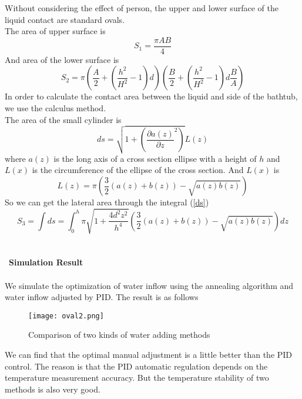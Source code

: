 \documentclass{mcmthesis}
\begin{document}
\indent Without considering the effect of person, the upper and lower surface of the liquid contact are standard ovals.\\
\indent The area of upper surface is\\
\begin{equation}
S_{1}=\frac{\pi AB}{4}
\end{equation}
\indent And area of the lower surface is\\
\begin{equation}
	S_{2}=\pi (\frac{A}{2}+(\frac{h^{2}}{H^{2}}-1)d)(\frac{B}{2}+(\frac{h^{2}}{H^{2}}-1)d\frac{B}{A})
\end{equation}
\indent In order to calculate the contact area between the liquid and side of the bathtub, we use the calculus method.\\
\indent The area of the small cylinder is 
\begin{equation}
ds=\sqrt{1+(\frac{\partial a(z)}{\partial z}^{2})} L(z)
\label{ds}
\end{equation}
\indent where $a(z)$ is the long axis of a cross section ellipse with a height of $h$ and $L(x)$ is the circumference of the ellipse of the cross section. And $L(x)$ is
\begin{equation}
L(z)=\pi (\frac{3}{2}(a(z)+b(z))-\sqrt{a(z)b(z)})
\end{equation} 
\indent So we can get the lateral area through the integral (\ref{ds})
\begin{equation}
	S_{3}=\int ds=\int_{0}^{h}\pi \sqrt{1+\frac{4d^{2}z^{2}}{h^{4}}}(\frac{3}{2}(a(z)+b(z))-\sqrt{a(z)b(z)})dz
\end{equation}\\\\
\noindent\
\textbf{Simulation Result}\\\\
\indent We simulate the optimization of water inflow using the annealing algorithm  and water inflow adjusted by PID. The result is as follows
\begin{figure}[H]
	\centerline{\texttt{[image: oval2.png]}}
	\caption{Comparison of two kinds of water adding methods}
	\label{circle}	
\end{figure}
\indent We can find that the optimal manual adjustment is a little better than the PID control. The reason is that the PID automatic regulation depends on the temperature measurement accuracy. But the temperature stability of  two methods is also very good.
\end{document}
